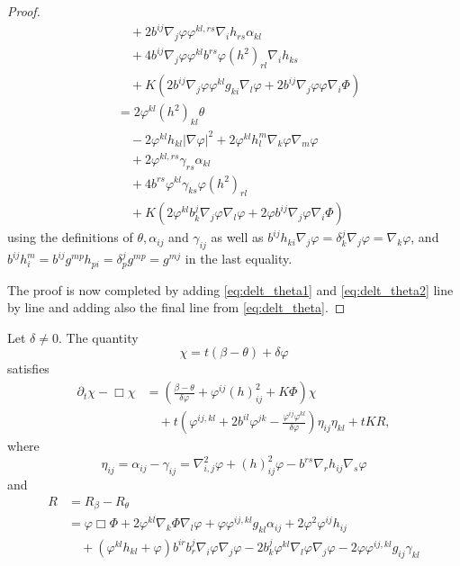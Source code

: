 \documentclass{amsart}
\begin{document}
\begin{proof}
\begin{equation}
\begin{split}
&\quad + 2 b^{ij} \nabla_j\varphi \varphi^{kl,rs}\nabla_i h_{rs} \alpha_{kl} \\
&\quad + 4 b^{ij} \nabla_j\varphi \varphi^{kl} b^{rs} \varphi(h^2)_{rl} \nabla_i h_{ks} \\
&\quad + K\left(2 b^{ij} \nabla_j\varphi \varphi^{kl}g_{ki} \nabla_l \varphi + 2 b^{ij} \nabla_j\varphi \varphi \nabla_i \Phi\right) \\
&= 2 \varphi^{kl}(h^2)_{kl}\theta \\
&\quad - 2 \varphi^{kl}h_{kl} |\nabla\varphi|^2 + 2 \varphi^{kl} h^{m}_{l} \nabla_k\varphi \nabla_m \varphi \\
&\quad + 2 \varphi^{kl,rs} \gamma_{rs} \alpha_{kl} \\
&\quad + 4 b^{rs} \varphi^{kl} \gamma_{ks} \varphi(h^2)_{rl} \\
&\quad + K\left(2 \varphi^{kl} b^j_k \nabla_j\varphi \nabla_l \varphi + 2 \varphi b^{ij} \nabla_j\varphi \nabla_i \Phi\right)
\end{split}
\end{equation}
using the definitions of \(\theta, \alpha_{ij}\) and \(\gamma_{ij}\) as well as \(b^{ij}h_{ki} \nabla_j \varphi = \delta^j_k \nabla_j \varphi = \nabla_k \varphi\), and \(b^{ij} h^m_i = b^{ij} g^{mp}h_{pi} = \delta^j_p g^{mp} = g^{mj}\) in the last equality.

The proof is now completed by adding \cref{eq:delt_theta1} and \cref{eq:delt_theta2} line by line and adding also the final line from \cref{eq:delt_theta}.
\end{proof}

\begin{theorem}
\label{thm:Evchi}
Let $\delta \neq 0.$ The quantity 
\[
\chi = t(\beta - \theta) + \delta\varphi
\]
satisfies
\[
\begin{split}
\partial_t \chi -\Box\chi &= \left(\frac{\beta - \theta}{\delta\varphi} + \varphi^{ij}(h)^2_{ij} + K\Phi\right)\chi \\
& \quad + t\left(\varphi^{ij,kl} + 2b^{il}\varphi^{jk} - \frac{\varphi^{ij}\varphi^{kl}}{\delta\varphi}\right)\eta_{ij}\eta_{kl} + tK R,
\end{split}
\]
where
\[
\eta_{ij} = \alpha_{ij} - \gamma_{ij} = \nabla^2_{i,j}\varphi + (h)^2_{ij}\varphi - b^{rs}\nabla_r h_{ij}\nabla_s \varphi
\]
and
\[
\begin{split}
R &= R_{\beta} - R_{\theta} \\
&= \varphi \Box \Phi + 2\varphi^{kl} \nabla_k \Phi \nabla_l \varphi + \varphi \varphi^{ij,kl}g_{kl} \alpha_{ij} + 2\varphi^{2}\varphi^{ij}h_{ij} \\
&\quad +(\varphi^{kl}h_{kl} + \varphi)b^{ir}b^{j}_{r}\nabla_i \varphi\nabla_j\varphi - 2 b^{j}_{k}\varphi^{kl}\nabla_l\varphi\nabla_j\varphi - 2 \varphi\varphi^{ij,kl} g_{ij} \gamma_{kl}
\end{split}
\]

\end{theorem}
	
\end{document}
